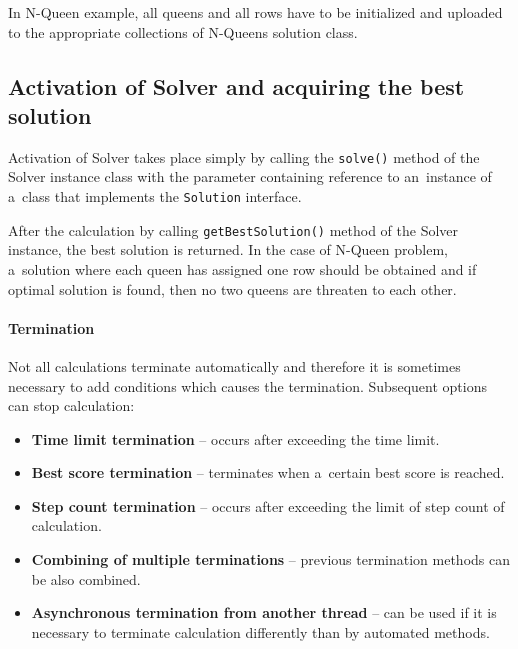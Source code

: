 In N-Queen example, all queens and all rows have to be initialized and uploaded to the appropriate collections of
N-Queens solution class.

\subsection{Activation of Solver and acquiring the best solution}
Activation of Solver takes place simply by calling the \texttt{solve()} method of the Solver instance class with the
parameter containing reference to an~instance of a~class that implements the \texttt{Solution} interface.

After the calculation by calling \texttt{getBestSolution()} method of the Solver instance, the best solution is
returned. In the case of N-Queen problem, a~solution where each queen has assigned one row should be obtained and if
optimal solution is found, then no two queens are threaten to each other.

\paragraph{Termination}
Not all calculations terminate automatically and therefore it is sometimes necessary to add conditions which causes the
termination. Subsequent options can stop calculation:

\begin{itemize}
    \item \textbf{Time limit termination} -- occurs after exceeding the time limit.
    \item \textbf{Best score termination} -- terminates when a~certain best score is reached.
    \item \textbf{Step count termination} -- occurs after exceeding the limit of step count of calculation.
    \item \textbf{Combining of multiple terminations} -- previous termination methods can be also combined.
    \item \textbf{Asynchronous termination from another thread} -- can be used if it is necessary to terminate
    calculation differently than by automated methods.
\end{itemize}
